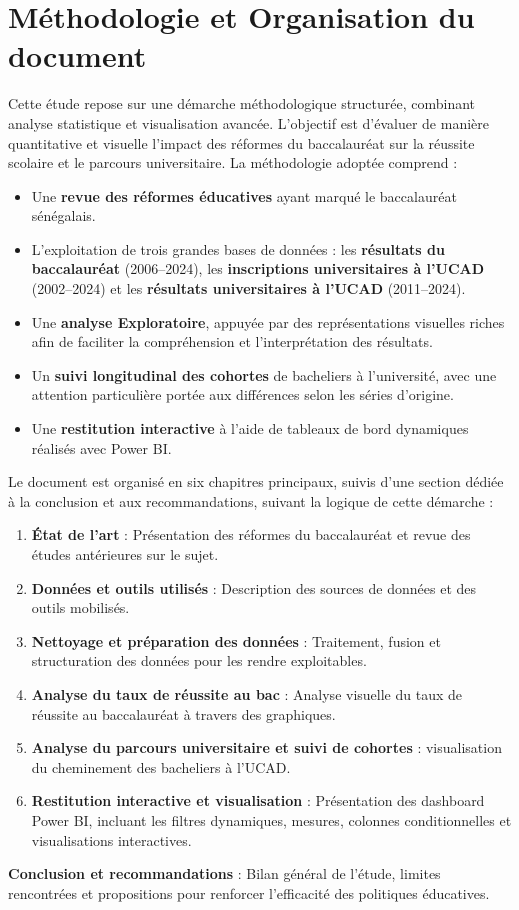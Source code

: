 \section*{Méthodologie et Organisation du document}

Cette étude repose sur une démarche méthodologique structurée, combinant analyse statistique et visualisation avancée. L’objectif est d’évaluer de manière quantitative et visuelle l’impact des réformes du baccalauréat sur la réussite scolaire et le parcours universitaire.
\newpage
La méthodologie adoptée comprend :

\begin{itemize}
    \item Une \textbf{revue des réformes éducatives} ayant marqué le baccalauréat sénégalais.
    \item L’exploitation de trois grandes bases de données : les \textbf{résultats du baccalauréat} (2006–2024), les \textbf{inscriptions universitaires à l’UCAD} (2002–2024) et les \textbf{résultats universitaires à l’UCAD} (2011–2024).
    \item Une \textbf{analyse Exploratoire}, appuyée par des représentations visuelles riches afin de faciliter la compréhension et l’interprétation des résultats.
    \item Un \textbf{suivi longitudinal des cohortes} de bacheliers à l’université, avec une attention particulière portée aux différences selon les séries d’origine.
    \item Une \textbf{restitution interactive} à l’aide de tableaux de bord dynamiques réalisés avec Power BI.
\end{itemize}


Le document est organisé en six chapitres principaux, suivis d'une section dédiée à la conclusion et aux recommandations, suivant la logique de cette démarche :

\begin{enumerate}
    \item \textbf{État de l’art} : Présentation des réformes du baccalauréat et revue des études antérieures sur le sujet.
    \item \textbf{Données et outils utilisés} : Description des sources de données et des outils mobilisés.
    \item \textbf{Nettoyage et préparation des données} : Traitement, fusion et structuration des données pour les rendre exploitables.
    \item \textbf{Analyse du taux de réussite au bac} : Analyse visuelle du taux de réussite au baccalauréat à travers des graphiques.
    \item \textbf{Analyse du parcours universitaire et suivi de cohortes} : visualisation du cheminement des bacheliers à l’UCAD.
    \item \textbf{Restitution interactive et visualisation} : Présentation des dashboard Power BI, incluant les filtres dynamiques, mesures, colonnes conditionnelles et visualisations interactives.
\end{enumerate}

\textbf{Conclusion et recommandations} : Bilan général de l’étude, limites rencontrées et propositions pour renforcer l’efficacité des politiques éducatives.